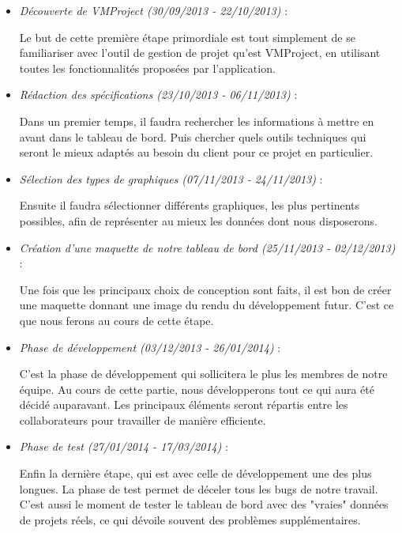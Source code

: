 \documentclass[12pt]{report}
\begin{document}
\begin{itemize}
\item \emph{Découverte de VMProject (30/09/2013 - 22/10/2013)} : 

Le but de cette première étape primordiale est tout simplement de se familiariser avec l'outil de gestion de projet qu'est VMProject, en utilisant toutes les fonctionnalités proposées par l'application.\\

\item \emph{Rédaction des spécifications (23/10/2013 - 06/11/2013)} :

Dans un premier temps, il faudra rechercher les informations à mettre en avant dans le tableau de bord. Puis chercher quels outils techniques qui seront le mieux adaptés au besoin du client pour ce projet en particulier.\\

\item \emph{Sélection des types de graphiques (07/11/2013 - 24/11/2013)} :

Ensuite il faudra sélectionner différents graphiques, les plus pertinents possibles, afin de représenter au mieux les données dont nous disposerons.\\

\item \emph{Création d'une maquette de notre tableau de bord (25/11/2013 - 02/12/2013)} :

Une fois que les principaux choix de conception sont faits, il est bon de créer une maquette donnant une image du rendu du développement futur. C'est ce que nous ferons au cours de cette étape.\\

\item \emph{Phase de développement (03/12/2013 - 26/01/2014)} :

C'est la phase de développement qui sollicitera le plus les membres de notre équipe. Au cours de cette partie, nous développerons tout ce qui aura été décidé auparavant. Les principaux éléments seront répartis entre les collaborateurs pour travailler de manière efficiente.\\

\item \emph{Phase de test (27/01/2014 - 17/03/2014)} :

Enfin la dernière étape, qui est avec celle de développement une des plus longues. La phase de test permet de déceler tous les bugs de notre travail. C'est aussi le moment de tester le tableau de bord avec des "vraies" données de projets réels, ce qui dévoile souvent des problèmes supplémentaires.\\

\end{itemize}
\end{document}
